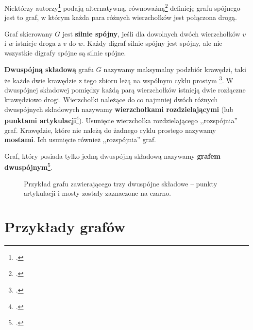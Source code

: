 Niektórzy autorzy\footcite[342]{ross} podają alternatywną, równoważną\footcite[42]{wilson} definicję grafu spójnego -- jest to graf, w którym każda para różnych wierzchołków jest połączona drogą. 

Graf skierowany $G$ jest \textbf{silnie spójny}, jeśli dla dowolnych dwóch wierzchołków $v$ i $w$ istnieje droga z $v$ do $w$. Każdy digraf silnie spójny jest spójny, ale nie wszystkie digrafy spójne są silnie spójne. 

\textbf{Dwuspójną składową} grafu $G$ nazywamy maksymalny podzbiór krawędzi, taki że każde dwie krawędzie z tego zbioru leżą na wspólnym cyklu prostym \footcite[634]{cormen}. W dwuspójnej składowej pomiędzy każdą parą wierzchołków istnieją dwie rozłączne krawędziowo drogi. Wierzchołki należące do co najmniej dwóch różnych dwuspójnych składowych nazywamy \textbf{wierzchołkami rozdzielającymi} (lub \textbf{punktami artykulacji}\footcite[633]{cormen}). Usunięcie wierzchołka rozdzielającego ,,rozspójnia'' graf. Krawędzie, które nie należą do żadnego cyklu prostego nazywamy \textbf{mostami}. Ich usunięcie również ,,rozspójnia'' graf.

Graf, który posiada tylko jedną dwuspójną składową nazywamy \textbf{grafem dwuspójnym}\footcite[232]{banachowski}.

\begin{figure}[h]
\centering
{}
\captionsetup{justification=centering}
\caption{Przykład grafu zawierającego trzy dwuspójne składowe -- punkty artykulacji i mosty zostały zaznaczone na czarno.} \label{fig:biconnected-copoments-example}
\end{figure}

\section{Przykłady grafów} \label{sec:common-graphs}

